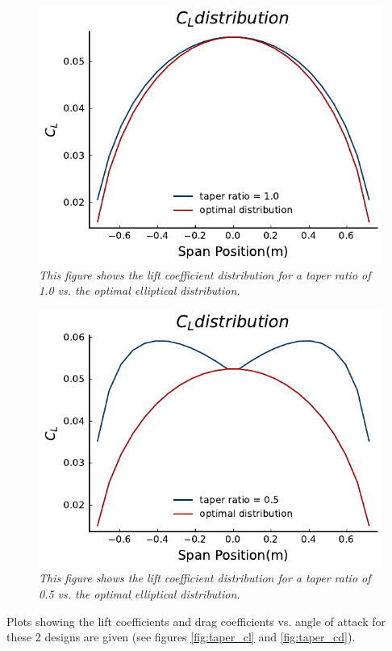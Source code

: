 \documentclass{journal}
\begin{document}
	\begin{figure}[H]
		\includegraphics{../graphics/cl_dist.pdf}
		\caption{\emph{This figure shows the lift coefficient distribution for a taper ratio of 1.0 vs. the optimal elliptical distribution.}}
		\label{fig:cl_dist}
	\end{figure}
	\begin{figure}[H]
		\includegraphics{../graphics/cl_dist_compare.pdf}
		\caption{\emph{This figure shows the lift coefficient distribution for a taper ratio of 0.5 vs. the optimal elliptical distribution.}}
		\label{fig:cl_dist_compare}
	\end{figure}
	
	Plots showing the lift coefficients and drag coefficients vs. angle of attack for these 2 designs are given (see figures \ref{fig:taper_cl} and \ref{fig:taper_cd}).
	
\end{document}

